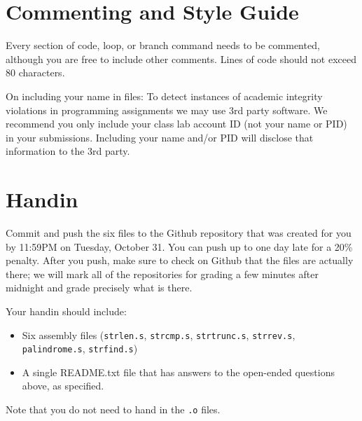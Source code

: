 \documentclass{article}
\begin{document}
\section{Commenting and Style Guide}

Every section of code, loop, or branch command needs to be commented, although
you are free to include other comments. Lines of code should not exceed 80
characters.

On including your name in files: To detect instances of academic integrity
violations in programming assignments we may use 3rd party software.  We
recommend you only include your class lab account ID (not your name or PID) in
your submissions.  Including your name and/or PID will disclose that
information to the 3rd party.

\section{Handin}

Commit and push the six files to the Github repository that was created
for you by 11:59PM on Tuesday, October 31. You can push up to one day late for
a 20\% penalty. After you push, make sure to check on Github that the files are
actually there; we will mark all of the repositories for grading a few minutes
after midnight and grade precisely what is there.

Your handin should include:

\begin{itemize}
\item Six assembly files ({\tt strlen.s}, {\tt strcmp.s}, {\tt strtrunc.s}, {\tt strrev.s}, {\tt palindrome.s}, {\tt strfind.s})
\item A single README.txt file that has answers to the open-ended questions
above, as specified.
\end{itemize}


Note that you do not need to hand in the {\tt .o} files.
\end{document}
